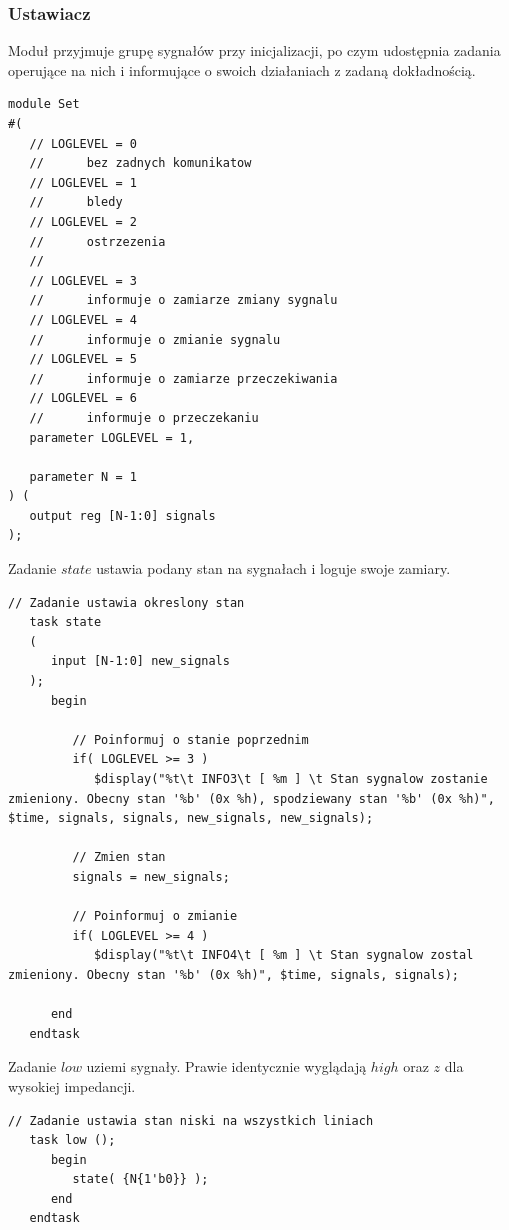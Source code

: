 \documentclass[a4paper,12pt]{article}
\begin{document}
\subsubsection{Ustawiacz}
Moduł przyjmuje grupę sygnałów przy inicjalizacji, po czym udostępnia zadania operujące na nich i informujące o swoich działaniach z zadaną dokładnością.
\begin{lstlisting}[label=Set,caption=Set.v]
module Set
#(
   // LOGLEVEL = 0
   //      bez zadnych komunikatow
   // LOGLEVEL = 1
   //      bledy
   // LOGLEVEL = 2
   //      ostrzezenia
   //
   // LOGLEVEL = 3
   //      informuje o zamiarze zmiany sygnalu
   // LOGLEVEL = 4
   //      informuje o zmianie sygnalu
   // LOGLEVEL = 5
   //      informuje o zamiarze przeczekiwania
   // LOGLEVEL = 6
   //      informuje o przeczekaniu
   parameter LOGLEVEL = 1,

   parameter N = 1
) (
   output reg [N-1:0] signals
);
\end{lstlisting}

Zadanie $state$ ustawia podany stan na sygnałach i loguje swoje zamiary.
\begin{lstlisting}[label=Set,caption=Set.v,firstnumber=25]
   // Zadanie ustawia okreslony stan
   task state
   (
      input [N-1:0] new_signals
   );
      begin

         // Poinformuj o stanie poprzednim
         if( LOGLEVEL >= 3 )
            $display("%t\t INFO3\t [ %m ] \t Stan sygnalow zostanie zmieniony. Obecny stan '%b' (0x %h), spodziewany stan '%b' (0x %h)", $time, signals, signals, new_signals, new_signals);

         // Zmien stan
         signals = new_signals;

         // Poinformuj o zmianie
         if( LOGLEVEL >= 4 )
            $display("%t\t INFO4\t [ %m ] \t Stan sygnalow zostal zmieniony. Obecny stan '%b' (0x %h)", $time, signals, signals);

      end
   endtask
\end{lstlisting}

Zadanie $low$ uziemi sygnały. Prawie identycznie wyglądają $high$ oraz $z$ dla wysokiej impedancji.
\begin{lstlisting}[label=Set,caption=Set.v,firstnumber=47]
   // Zadanie ustawia stan niski na wszystkich liniach
   task low ();
      begin
         state( {N{1'b0}} );
      end
   endtask
\end{lstlisting}
\end{document}
